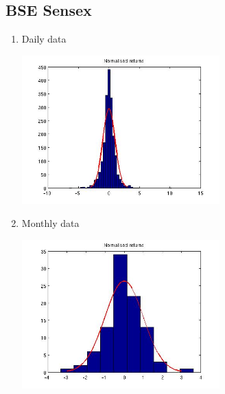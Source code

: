 \documentclass[12pt]{article}
\begin{document}
  \subsection*{BSE Sensex}
  \begin{enumerate}
    \item Daily data
      \begin{center}
        \includegraphics[width=3in]{sensexdailynr.jpg}
      \end{center}
    \item Monthly data
      \begin{center}
        \includegraphics[width=3in]{sensexmonthlynr.jpg}
      \end{center}
  \end{enumerate}
\end{document}
